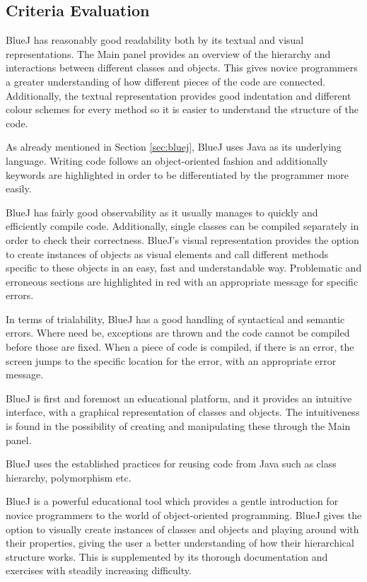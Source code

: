 \subsection{Criteria Evaluation}
\begin{description}[style=nextline]
\item[Readability]
BlueJ has reasonably good readability both by its textual and visual representations. The Main panel provides an overview of the hierarchy and interactions between different classes and objects. This gives novice programmers a greater understanding of how different pieces of the code are connected. Additionally, the textual representation provides good indentation and different colour schemes for every method so it is easier to understand the structure of the code.
\item[Writability]
As already mentioned in Section \ref{sec:bluej}, BlueJ uses Java as its underlying language. Writing code follows an object-oriented fashion and additionally keywords are highlighted in order to be differentiated by the programmer more easily.
\item[Observability]
BlueJ has fairly good observability as it usually manages to quickly and efficiently compile code. Additionally, single classes can be compiled separately in order to check their correctness. BlueJ's visual representation provides the option to create instances of objects as visual elements and call different methods specific to these objects in an easy, fast and understandable way. Problematic and erroneous sections are highlighted in red with an appropriate message for specific errors.  
\item[Trialability]
In terms of trialability, BlueJ has a good handling of syntactical and semantic errors. Where need be, exceptions are thrown and the code cannot be compiled before those are fixed. When a piece of code is compiled, if there is an error, the screen jumps to the specific location for the error, with an appropriate error message.
\item[Learnability]
BlueJ is first and foremost an educational platform, and it provides an intuitive interface, with a graphical representation of classes and objects. The intuitiveness is found in the possibility of creating and manipulating these through the Main panel.
\item[Reusability]
BlueJ uses the established practices for reusing code from Java such as class hierarchy, polymorphism etc.
\item[Pedagogic Value]
BlueJ is a powerful educational tool which provides a gentle introduction for novice programmers to the world of object-oriented programming.  BlueJ gives the option to visually create instances of classes and objects and playing around with their properties, giving the user a better understanding of how their hierarchical structure works. This is supplemented by its thorough documentation and exercises with steadily increasing difficulty.

\end{description}
